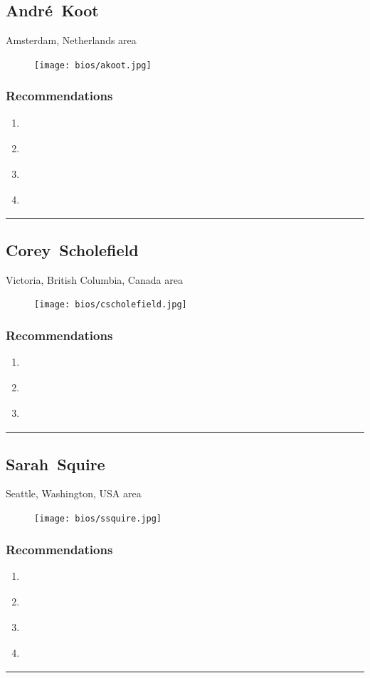 \subsection{André~Koot} \textsf{Amsterdam, Netherlands area} \par \setlength{\columnsep}{0pt} \begin{figure} \centering \texttt{[image: bios/akoot.jpg]} \end{figure}  \subsubsection{Recommendations}\begin{enumerate}
\item \cite{Cameron2005}
\item \cite{Hardt2005}
\item \cite{Harper2006}
\item \cite{Williamson2017}
\end{enumerate}\noindent\rule{\textwidth}{0.2pt}

\subsection{Corey~Scholefield} \textsf{Victoria, British Columbia, Canada area} \par \setlength{\columnsep}{0pt} \begin{figure} \centering \texttt{[image: bios/cscholefield.jpg]} \end{figure}  \subsubsection{Recommendations}\begin{enumerate}
\item \cite{Hazelton2015}
\item \cite{Prasad2012}
\item \cite{Windley2005}
\end{enumerate}\noindent\rule{\textwidth}{0.2pt}

\subsection{Sarah~Squire} \textsf{Seattle, Washington, USA area} \par \setlength{\columnsep}{0pt} \begin{figure} \centering \texttt{[image: bios/ssquire.jpg]} \end{figure}  \subsubsection{Recommendations}\begin{enumerate}
\item \cite{Gilman2017}
\item \cite{Hardt2005}
\item \cite{NSTIC2011}
\item \cite{Richer2017}
\end{enumerate}\noindent\rule{\textwidth}{0.2pt}

